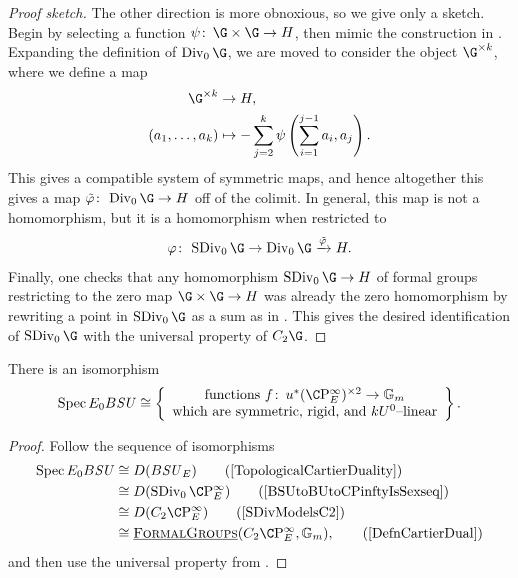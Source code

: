 \begin{proof}[Proof sketch]
The other direction is more obnoxious, so we give only a sketch.
Begin by selecting a function \(\psi\co \G \times \G \to H\), then mimic the construction in .
Expanding the definition of \(\Div_0 \G\), we are moved to consider the object \(\G^{\times k}\), where we define a map
\begin{align*}
\G^{\times k} & \to H, \\
(a_1, \ldots, a_k) & \mapsto -\sum_{j=2}^k \psi\left(\sum_{i=1}^{j-1} a_i, a_j \right).
\end{align*}
This gives a compatible system of symmetric maps, and hence altogether this gives a map \(\tilde\phi\co\Div_0 \G \to H\) off of the colimit.
In general, this map is not a homomorphism, but it is a homomorphism when restricted to \[\phi\co \SDiv_0 \G \to \Div_0 \G \xrightarrow{\tilde\phi} H.\]
Finally, one checks that any homomorphism \(\SDiv_0 \G \to H\) of formal groups restricting to the zero map \(\G \times \G \to H\) was already the zero homomorphism by rewriting a point in \(\SDiv_0 \G\) as a sum as in .
This gives the desired identification of \(\SDiv_0 \G\) with the universal property of \(C_2 \G\).
\end{proof}

\begin{corollary}\label{CharacterizationOfBSUUpperE}
There is an isomorphism \[\Spec E_0 B\SU \cong \left\{\begin{array}{c} \text{functions \(f\co u^* (\CP^\infty_E)^{\times 2} \to \Gm\)} \\ \text{which are symmetric, rigid, and \(kU^0\)--linear} \end{array}\right\}.\]
\end{corollary}
\begin{proof}
Follow the sequence of isomorphisms
\begin{align*}
\Spec E_0 B\SU & \cong D(B\SU_E) \tag{\Cref{TopologicalCartierDuality}} \\
& \cong D(\SDiv_0 \CP^\infty_E) \tag{\Cref{BSUtoBUtoCPinftyIsSexseq}} \\
& \cong D(C_2 \CP^\infty_E) \tag{\Cref{SDivModelsC2}} \\
& \cong \InternalHom{FormalGroups}(C_2 \CP^\infty_E, \Gm), \tag{\Cref{DefnCartierDual}}
\end{align*}
and then use the universal property from .
\end{proof}

